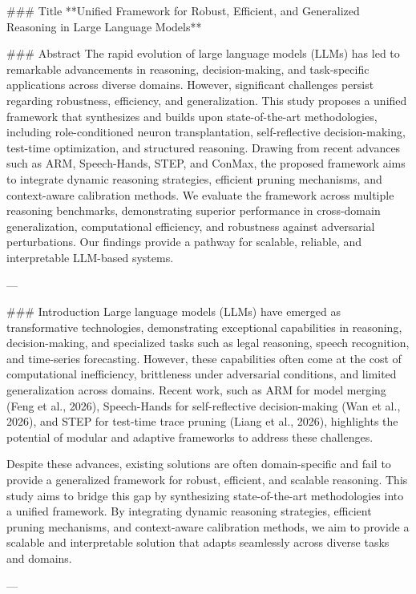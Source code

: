 ### Title  
**Unified Framework for Robust, Efficient, and Generalized Reasoning in Large Language Models**

### Abstract  
The rapid evolution of large language models (LLMs) has led to remarkable advancements in reasoning, decision-making, and task-specific applications across diverse domains. However, significant challenges persist regarding robustness, efficiency, and generalization. This study proposes a unified framework that synthesizes and builds upon state-of-the-art methodologies, including role-conditioned neuron transplantation, self-reflective decision-making, test-time optimization, and structured reasoning. Drawing from recent advances such as ARM, Speech-Hands, STEP, and ConMax, the proposed framework aims to integrate dynamic reasoning strategies, efficient pruning mechanisms, and context-aware calibration methods. We evaluate the framework across multiple reasoning benchmarks, demonstrating superior performance in cross-domain generalization, computational efficiency, and robustness against adversarial perturbations. Our findings provide a pathway for scalable, reliable, and interpretable LLM-based systems.

---

### Introduction  
Large language models (LLMs) have emerged as transformative technologies, demonstrating exceptional capabilities in reasoning, decision-making, and specialized tasks such as legal reasoning, speech recognition, and time-series forecasting. However, these capabilities often come at the cost of computational inefficiency, brittleness under adversarial conditions, and limited generalization across domains. Recent work, such as ARM for model merging (Feng et al., 2026), Speech-Hands for self-reflective decision-making (Wan et al., 2026), and STEP for test-time trace pruning (Liang et al., 2026), highlights the potential of modular and adaptive frameworks to address these challenges.

Despite these advances, existing solutions are often domain-specific and fail to provide a generalized framework for robust, efficient, and scalable reasoning. This study aims to bridge this gap by synthesizing state-of-the-art methodologies into a unified framework. By integrating dynamic reasoning strategies, efficient pruning mechanisms, and context-aware calibration methods, we aim to provide a scalable and interpretable solution that adapts seamlessly across diverse tasks and domains.

---


